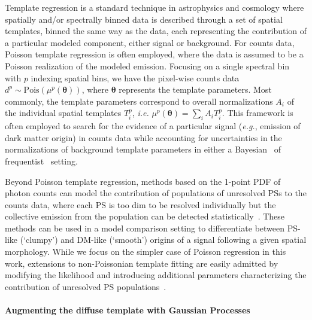 \documentclass[]{article}
\begin{document}
Template regression is a standard technique in astrophysics and cosmology where spatially and/or spectrally binned data is described through a set of spatial templates, binned the same way as the data, each representing the contribution of a particular modeled component, either signal or background. For counts data, Poisson template regression is often employed, where the data is assumed to be a Poisson realization of the modeled emission. Focusing on a single spectral bin with $p$ indexing spatial bins, we have the pixel-wise counts data $d^{p}\sim\mathrm{Pois}\left(\mu^{p}(\boldsymbol{\theta})\right)$, where $\boldsymbol{\theta}$ represents the template parameters. Most commonly, the template parameters correspond to overall normalizations $A_i$ of the individual spatial templates $T_{i}^{p}$,  \emph{i.e.} $\mu^{p}(\boldsymbol{\theta}) = \sum_{i}A_i T_{i}^{p}$. This framework is often employed to search for the evidence of a particular signal (\emph{e.g.}, emission of dark matter origin) in counts data while accounting for uncertainties in the  normalizations of background template parameters in either a Bayesian~\cite{Hoof:2018hyn} of frequentist~\cite{Lisanti:2017qoz} setting.

Beyond Poisson template regression, methods based on the 1-point PDF of photon counts can model the contribution of populations of unresolved PSs to the counts data, where each PS is too dim to be resolved individually but the collective emission from the population can be detected statistically~\cite{Malyshev:2011zi,Lee:2014mza}. These methods can be used in a model comparison setting to differentiate between PS-like (`clumpy') and DM-like (`smooth') origins of a signal following a given spatial morphology. While we focus on the simpler case of Poisson regression in this work, extensions to non-Poissonian template fitting are easily admitted by modifying the likelihood and introducing additional parameters characterizing the contribution of unresolved PS populations~\cite{Mishra-Sharma:2016gis}. 

\paragraph{Augmenting the diffuse template with Gaussian Processes} 
\end{document}
